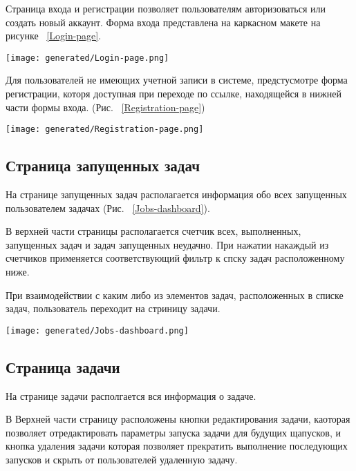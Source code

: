 Страница входа и регистрации позволяет пользователям авторизоваться или создать новый аккаунт. Форма входа представлена на каркасном макете на рисунке ~\ref{Login-page}.

\begin{figure*}[!t]
  \centering
  \texttt{[image: generated/Login-page.png]}
  \caption{Каркасный макет страницы входа}
  \label{Login-page}
\end{figure*}

Для пользователей не имеющих учетной записи в системе, предстусмотре форма регистрации, которя доступная при переходе по ссылке, находящейся в нижней части формы входа. (Рис. ~\ref{Registration-page})

\begin{figure*}[!t]
  \centering
  \texttt{[image: generated/Registration-page.png]}
  \caption{Каркасный макет страницы регистрации пользователя}
  \label{Registration-page}
\end{figure*}

\subsection{Страница запущенных задач}

На странице запущенных задач располагается информация обо всех запущенных пользователем задачах (Рис. ~\ref{Jobs-dashboard}).

В верхней части страницы располагается счетчик всех, выполненных, запущенных задач и задач запущенных неудачно.
При нажатии накаждый из счетчиков применяется соответствующий фильтр к спску задач расположенному ниже.

При взаимодействии с каким либо из элементов задач, расположенных в списке задач, пользователь переходит на стриницу задачи.

\begin{figure*}[!t]
  \centering
  \texttt{[image: generated/Jobs-dashboard.png]}
  \caption{Каркасный макет страницы запущенных задач}
  \label{Jobs-dashboard}
\end{figure*}

\subsection{Страница задачи}

На странице задачи располгается вся информация о задаче.

В Верхней части страницу расположены кнопки редактирования задачи, каоторая позволяет отредактировать параметры запуска задачи для будущих щапусков, и кнопка удаления задачи которая позволяет прекратить выполнение последующих запусков и скрыть от пользователей удаленную задачу.

